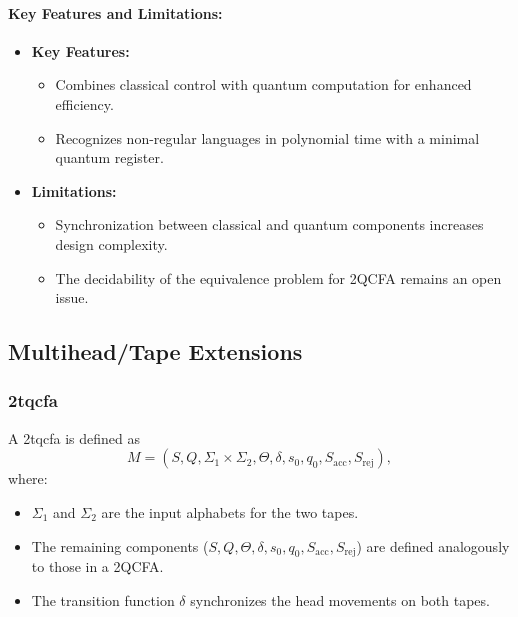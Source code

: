 \paragraph{Key Features and Limitations:}
\begin{itemize}
    \item \textbf{Key Features:}
    \begin{itemize}
        \item Combines classical control with quantum computation for enhanced efficiency.
        \item Recognizes non-regular languages in polynomial time with a minimal quantum register.
    \end{itemize}
    \item \textbf{Limitations:}
    \begin{itemize}
        \item Synchronization between classical and quantum components increases design complexity.
        \item The decidability of the equivalence problem for 2QCFA remains an open issue.
    \end{itemize}
\end{itemize}

\subsection{Multihead/Tape Extensions}
\label{subsec:multihead-tape}

\subsubsection{\gls{2tqcfa}}
\label{sssec:2tqcfa}
\begin{definition}
A \gls{2tqcfa} is defined as 
\[
M = (S, Q, \Sigma_1 \times \Sigma_2, \Theta, \delta, s_0, q_0, S_{\text{acc}}, S_{\text{rej}}),
\]
where:
\begin{itemize}
    \item \( \Sigma_1 \) and \( \Sigma_2 \) are the input alphabets for the two tapes.
    \item The remaining components (\( S, Q, \Theta, \delta, s_0, q_0, S_{\text{acc}}, S_{\text{rej}} \)) are defined analogously to those in a 2QCFA.
    \item The transition function \(\delta\) synchronizes the head movements on both tapes.
\end{itemize}
\end{definition}

